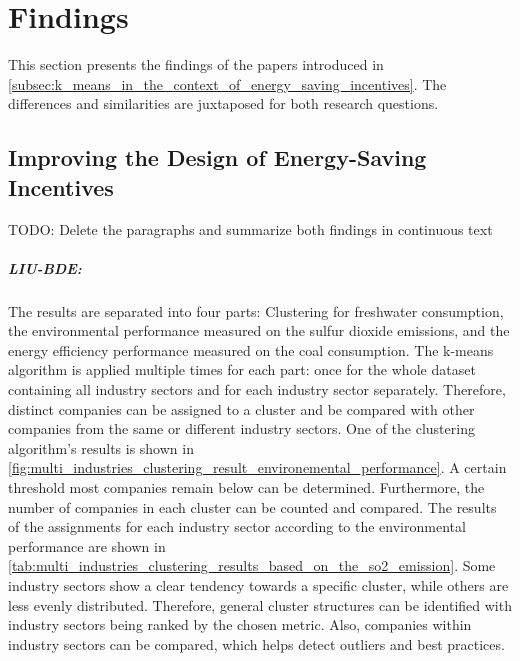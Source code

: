 \chapter{Findings}
\label{cha:findings}

This section presents the findings of the papers introduced in \autoref{subsec:k_means_in_the_context_of_energy_saving_incentives}.
The differences and similarities are juxtaposed for both research questions.

\section{Improving the Design of Energy-Saving Incentives}
\label{sec:improving_the_design_of_energy_saving_incentives}

TODO: Delete the paragraphs and summarize both findings in continuous text
\paragraph*{LIU-BDE:}
The results are separated into four parts: Clustering for freshwater consumption, the environmental performance measured on the sulfur dioxide emissions, and the energy efficiency performance measured on the coal consumption.
The k-means algorithm is applied multiple times for each part: once for the whole dataset containing all industry sectors and for each industry sector separately.
Therefore, distinct companies can be assigned to a cluster and be compared with other companies from the same or different industry sectors.
One of the clustering algorithm's results is shown in \autoref{fig:multi_industries_clustering_result_environemental_performance}.
A certain threshold most companies remain below can be determined.
Furthermore, the number of companies in each cluster can be counted and compared.
The results of the assignments for each industry sector according to the environmental performance are shown in \autoref{tab:multi_industries_clustering_results_based_on_the_so2_emission}.
Some industry sectors show a clear tendency towards a specific cluster, while others are less evenly distributed.
Therefore, general cluster structures can be identified with industry sectors being ranked by the chosen metric.
Also, companies within industry sectors can be compared, which helps detect outliers and best practices.

